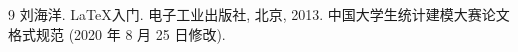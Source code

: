 
\begin{thebibliography}{9}%
    刘海洋.
    \newblock \LaTeX {}入门\allowbreak[J].
    \newblock 电子工业出版社, 北京, 2013.
    中国大学生统计建模大赛论文格式规范 (2020 年 8 月 25 日修改).
\end{thebibliography}

